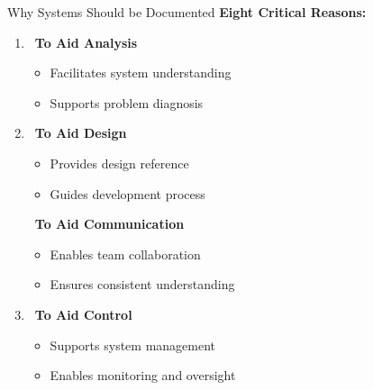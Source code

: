 \documentclass[aspectratio=169]{beamer}
\begin{document}
\begin{frame}{Why Systems Should be Documented}
    \textbf{Eight Critical Reasons:}
    
    \begin{enumerate}
        \item\, \textbf{To Aid Analysis}
        \begin{itemize}
            \item Facilitates system understanding
            \item Supports problem diagnosis
        \end{itemize}
        
        \item\, \textbf{To Aid Design}
        \begin{itemize}
            \item Provides design reference
            \item Guides development process
        \end{itemize}
        
        \items\, \textbf{To Aid Communication}
        \begin{itemize}
            \item Enables team collaboration
            \item Ensures consistent understanding
        \end{itemize}
        
        \item\, \textbf{To Aid Control}
        \begin{itemize}
            \item Supports system management
            \item Enables monitoring and oversight
        \end{itemize}
    \end{enumerate}
\end{frame}
\end{document}
